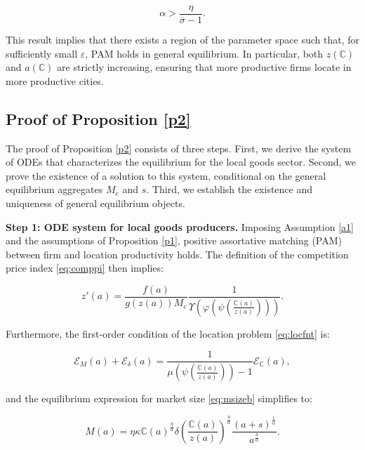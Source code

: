 \begin{equation*}
\alpha > \frac{\eta}{\overline{\sigma} - 1}.
\end{equation*}

This result implies that there exists a region of the parameter space such that, for sufficiently small $\varepsilon$, PAM holds in general equilibrium. In particular, both $z(\mathbb{C})$ and $a(\mathbb{C})$ are strictly increasing, ensuring that more productive firms locate in more productive cities.

\subsection{Proof of Proposition \ref{p2}}\label{proof:p3}  
The proof of Proposition \ref{p2} consists of three steps. First, we derive the system of ODEs that characterizes the equilibrium for the local goods sector. Second, we prove the existence of a solution to this system, conditional on the general equilibrium aggregates $M_e$ and $s$. Third, we establish the existence and uniqueness of general equilibrium objects.  

\textbf{Step 1: ODE system for local goods producers.}  
Imposing Assumption \ref{a1} and the assumptions of Proposition \ref{p1}, positive assortative matching (PAM) between firm and location productivity holds. The definition of the competition price index \eqref{eq:comppi} then implies:

\begin{equation}\label{eq:ode1}
	z'(a)  = \frac{f(a)}{g(z(a)) M_e} \frac{1}{\Upsilon\left(\varphi \left(\psi \left(\frac{\mathbb{C}(a)}{z(a)}\right)\right)\right)}.
\end{equation}

Furthermore, the first-order condition of the location problem \eqref{eq:locfnt} is:

\begin{equation}\label{eq:focdec}
    \mathcal{E}_{M}(a) + \mathcal{E}_{\delta}(a) = \frac{1}{\mu\left(\psi\left(\frac{\mathbb{C}(a)}{z(a)}\right)\right) -1}\mathcal{E}_\mathbb{C}(a),
\end{equation}

and the equilibrium expression for market size \eqref{eq:msizeb} simplifies to:

\begin{equation*}
	M(a) = \eta \kappa \mathbb{C}(a)^{\frac{\eta}{\alpha}} \delta \left(\frac{\mathbb{C}(a)}{z(a)}\right)^{\frac{\eta}{\alpha}} \frac{(a + s)^{\frac{1}{\alpha}}}{a^\frac{\eta}{\alpha}}.
\end{equation*}

